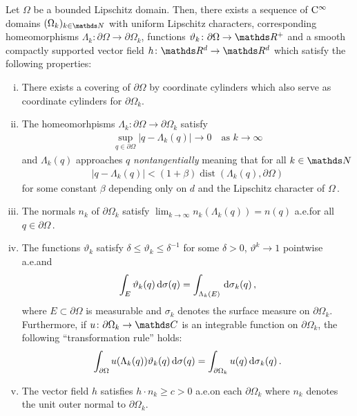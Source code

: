 \begin{thm}[Ne\v{c}as, Verchota]
  \label{thm:smoothApproximation}
  Let $\Omega$ be a bounded Lipschitz domain.
  Then, there exists a sequence of $\mathrm{C}^\infty$ domains $(\Omega_k)_{k \in \N}$ with uniform Lipschitz characters, corresponding homeomorphisms $\Lambda_k \colon \partial\Omega \to \partial\Omega_k$, functions $\vartheta_k \colon \partial\Omega \to \R^+$ and a smooth compactly supported vector field $h \colon \R^d \to \R^d$ which satisfy the following properties:
  \begin{enumerate}[i)]
    \item There exists a covering of $\partial\Omega$ by coordinate cylinders which also serve as coordinate cylinders for $\partial\Omega_k$.
    \item The homeomorhpisms $\Lambda_k \colon \partial \Omega \to \partial\Omega_k$ satisfy
      \begin{align*}
        \sup_{q \in \partial\Omega} |q - \Lambda_k(q)| \to 0\quad\text{as } k \to \infty
      \end{align*}
      and $\Lambda_k(q)$ approaches $q$ \emph{nontangentially} meaning that for all $k \in \N$
      \begin{align*}
        | q - \Lambda_k(q) | < (1 + \beta) \operatorname{dist}(\Lambda_k(q), \partial\Omega)
      \end{align*}
      for some constant $\beta$ depending only on $d$ and the Lipschitz character of $\Omega\,$.
    \item The normals $n_k$ of $\partial\Omega_k$ satisfy $\lim_{k \to \infty} n_k(\Lambda_k(q)) = n(q)$ a.e.\@ for all $q \in \partial\Omega$\,.
    \item The functions $\vartheta_k$ satisfy $\delta \leq \vartheta_k \leq \delta^{-1}$ for some $\delta > 0$, $\vartheta^k \to 1$ pointwise a.e.\@ and
      \begin{align*}
        \int_E \vartheta_k(q) \, {\operatorname{d}\!{\sigma}}(q) = \int_{\Lambda_k(E)} \, {\operatorname{d}\!{\sigma}}_k(q)\,,
      \end{align*}
      where $E \subset \partial \Omega$ is measurable and $\sigma_k$ denotes the surface measure on $\partial\Omega_k$.
      Furthermore, if $u \colon \partial\Omega_k \to \C$ is an integrable function on $\partial\Omega_k$, the following ``transformation rule'' holds:
      \begin{align*}
         \int_{\partial\Omega} u(\Lambda_k(q)) \vartheta_k(q) \, {\operatorname{d}\!{\sigma}}(q) = \int_{\partial\Omega_k} u(q) \, {\operatorname{d}\!{\sigma}}_k(q) \,.
      \end{align*}
    \item The vector field $h$ satisfies $h \cdot  n_k \geq c > 0$ a.e.\@ on each $\partial\Omega_k$ where $n_k$ denotes the unit outer normal to $\partial\Omega_k$.
  \end{enumerate}
\end{thm}

